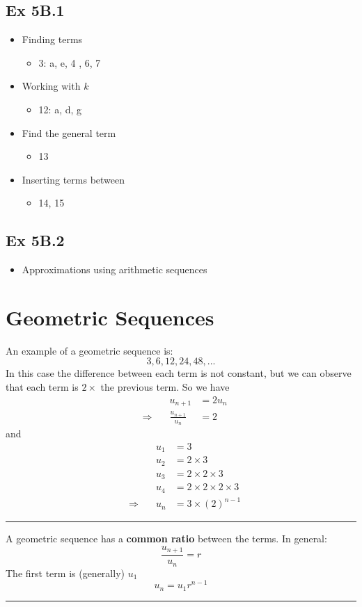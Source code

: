 \documentclass[12pt]{article}
\begin{document}
\subsection{Ex 5B.1}
\renewcommand{\labelitemii}{$\star$}
\begin{multicols}{4}
\begin{itemize}
	\item Finding terms 
	\begin{itemize}
		\item 3: a, e, 4 , 6, 7
	\end{itemize}
	\item Working with $k$
		\begin{itemize}
		\item 12: a, d, g
	\end{itemize}
		\item Find the general term
	\begin{itemize}
		\item 13
	\end{itemize}
	\item Inserting terms between
			\begin{itemize}
		\item 14, 15
	\end{itemize}
	
\end{itemize}
\end{multicols}
 
\subsection{Ex 5B.2}
\begin{itemize}
	\item Approximations using arithmetic sequences
\end{itemize}
\newpage
\section{Geometric  Sequences}
An example of a geometric sequence is:
\LARGE $$3,6,12, 24, 48,...$$ \normalsize
In this case the difference between each term is not constant, but we can observe that each term is $2 \times$ the previous term.
So we have 
\begin{alignat*}{2}
&\qquad &u_{n+1} &= 2u_n\\
	&\Rightarrow& \frac{ u_{n+1} }{ u_n }&= 2
\end{alignat*}
and 
\begin{alignat*}{2}
	&\qquad &u_{1} &= 3\\
	&& u_2&= 2\times 3\\
	&& u_3&= 2\times 2\times 3\\
	&& u_4&=  2\times2\times 2\times 3\\
	&\Rightarrow&u_n&= 3\times(2)^{n-1}
\end{alignat*}
\hrule\vspace{0.5cm}
A geometric sequence has a \textbf{common ratio} between the terms.
In general:
$$\frac{ u_{n+1} }{ u_n } = r$$
The first term is (generally) $u_1$
\LARGE$$u_n = u_1 r^{n-1}$$\normalsize
\vspace{0.5cm}\hrule
\end{document}
